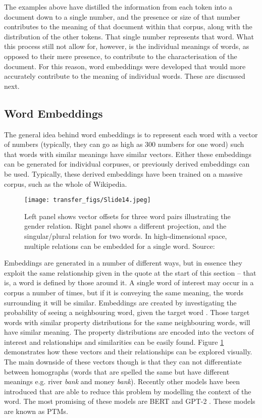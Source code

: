 The examples above have distilled the information from each token into a document down to a single number, and the presence or size of that number contributes to the meaning of that document within that corpus, along with the distribution of the other tokens. That single number represents that word. What this process still not allow for, however, is the individual meanings of words, as opposed to their mere presence, to contribute to the characterisation of the document. For this reason, word embeddings were developed that would more accurately contribute to the meaning of individual words. These are discussed next. 


\subsection{Word Embeddings}

The general idea behind word embeddings is to represent each word with a vector of numbers (typically, they can go as high as 300 numbers for one word) such that words with similar meanings have similar vectors. Either these embeddings can be generated for individual corpuses, or previously derived embeddings can be used. Typically, these derived embeddings have been trained on a massive corpus, such as the whole of Wikipedia.

\begin{figure}
  \texttt{[image: transfer\_figs/Slide14.jpeg]}
  \caption[Word Embeddings visual example]{Left panel shows vector offsets for three word pairs illustrating the gender relation. Right panel shows a different projection, and the singular/plural relation for two words. In high-dimensional space, multiple relations can be embedded for a single word. Source: \textcite{mikolov2013linguistic}}
  \label{fig:word}
\end{figure}

Embeddings are generated in a number of different ways, but in essence they exploit the same relationship given in the quote at the start of this section – that is, a word is defined by those around it. A single word of interest may occur in a corpus a number of times, but if it is conveying the same meaning, the words surrounding it will be similar. Embeddings are created by investigating the probability of seeing a neighbouring word, given the target word  \parencite{mikolov2013efficient}. Those target words with similar property distributions for the same neighbouring words, will have similar meaning. The property distributions are encoded into the vectors of interest and relationships and similarities can be easily found. Figure \ref{fig:word} demonstrates how these vectors and their relationships can be explored visually. The main downside of these vectors though is that they can not differentiate between homographs (words that are spelled the same but have different meanings e.g. river \emph{bank}  and money \emph{bank}). Recently other models have been introduced that are able to reduce this problem by modelling the context of the word. The most promising of these models are BERT \parencite{devlin2018bert} and GPT-2 \parencite{radford2019language}. These models are known as PTMs.


